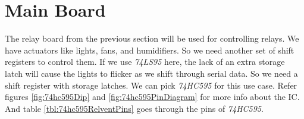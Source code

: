 \documentclass[../../main]{subfiles}
\begin{document}
\section{Main Board} \label{sec:}

The relay board from the previous section will be used for controlling relays. We have actuators
like lights, fans, and humidifiers. So we need another set of shift registers to control them. If
we use \emph{74LS95} here, the lack of an extra storage latch will cause the lights to flicker
as we shift through serial data. So we need a shift register with storage latches. We can pick
\emph{74HC595} for this use case. Refer figures \ref{fig:74hc595Dip} and \ref{fig:74hc595PinDiagram}
for more info about the IC. And table \ref{tbl:74hc595RelventPins} goes through the pins of
\emph{74HC595}.

\end{document}
